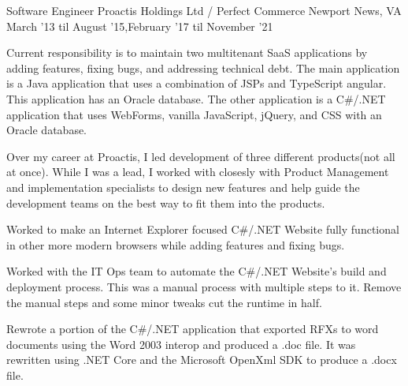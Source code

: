 

\begin{cventries}

    \cventry
    {Software Engineer} %
    {Proactis Holdings Ltd / Perfect Commerce} %
    {Newport News, VA} %
    {March '13 til August '15,\newline February '17 til November '21} %
    {
        \begin{cvitems} %
        \item {Current responsibility is to maintain two multitenant SaaS applications by adding features, fixing bugs, and addressing technical debt.
            The main application is a Java application that uses a combination of JSPs and TypeScript angular. This application has an Oracle database.
            The other application is a C\#/.NET application that uses WebForms, vanilla JavaScript, jQuery, and CSS with an Oracle database.}
        \item {Over my career at Proactis, I led development of three different products(not all at once). 
            While I was a lead, I worked with closesly with Product Management and implementation specialists to design new features 
            and help guide the development teams on the best way to fit them into the products.}
        \item {Worked to make an Internet Explorer focused C\#/.NET Website fully functional in other more modern browsers while adding features and fixing bugs.}
        \item {Worked with the IT Ops team to automate the C\#/.NET Website's build and deployment process.
            This was a manual process with multiple steps to it. Remove the manual steps and some minor tweaks cut the runtime in half.} 
        \item {Rewrote a portion of the C\#/.NET application that exported RFXs to word documents using the Word 2003 interop and produced a .doc file. 
            It was rewritten using .NET Core and the Microsoft OpenXml SDK to produce a .docx file.}

\end{cvitems}}
\end{cventries}
